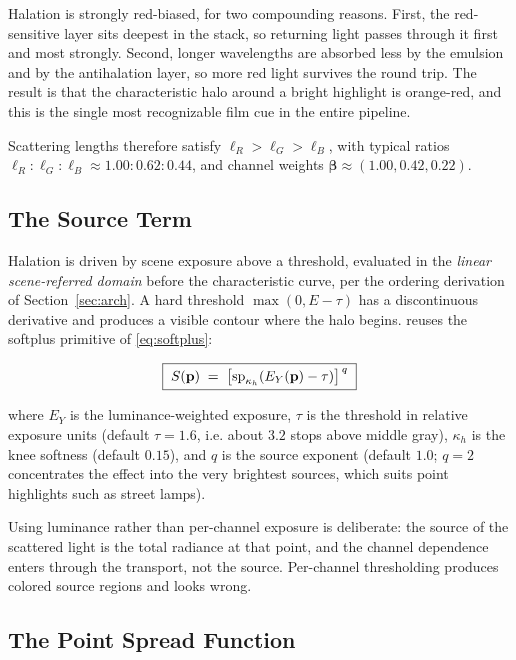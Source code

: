 Halation is strongly red-biased, for two compounding reasons. First, the
red-sensitive layer sits deepest in the stack, so returning light passes through
it first and most strongly. Second, longer wavelengths are absorbed less by the
emulsion and by the antihalation layer, so more red light survives the round
trip. The result is that the characteristic halo around a bright highlight is
orange-red, and this is the single most recognizable film cue in the entire
pipeline.

Scattering lengths therefore satisfy $\ell_R > \ell_G > \ell_B$, with typical
ratios $\ell_R : \ell_G : \ell_B \approx 1.00 : 0.62 : 0.44$, and channel
weights $\boldsymbol{\beta} \approx (1.00, 0.42, 0.22)$.

\subsection{The Source Term}

Halation is driven by scene exposure above a threshold, evaluated in the
\emph{linear scene-referred domain} before the characteristic curve, per the
ordering derivation of Section~\ref{sec:arch}. A hard threshold
$\max(0, E - \tau)$ has a discontinuous derivative and produces a visible
contour where the halo begins. \EM{} reuses the softplus primitive of
\eqref{eq:softplus}:

\begin{equation}
\boxed{\;S(\mathbf{p}) \;=\; \left[\mathrm{sp}_{\kappa_h}\!\left(E_Y(\mathbf{p}) - \tau\right)\right]^{\,q}\;}
\label{eq:halsource}
\end{equation}

where $E_Y$ is the luminance-weighted exposure, $\tau$ is the threshold in
relative exposure units (default $\tau = 1.6$, i.e. about $3.2$ stops above
middle gray), $\kappa_h$ is the knee softness (default $0.15$), and $q$ is the
source exponent (default $1.0$; $q = 2$ concentrates the effect into the very
brightest sources, which suits point highlights such as street lamps).

Using luminance rather than per-channel exposure is deliberate: the source of the
scattered light is the total radiance at that point, and the channel dependence
enters through the transport, not the source. Per-channel thresholding produces
colored source regions and looks wrong.

\subsection{The Point Spread Function}

